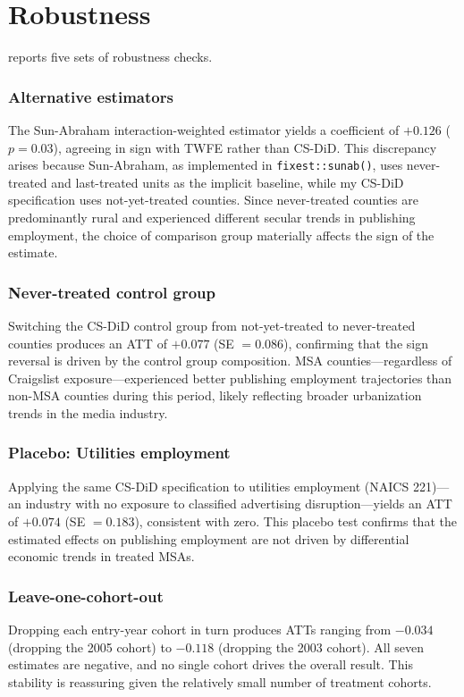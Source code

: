\documentclass[12pt]{article}
\begin{document}



\section{Robustness}

 reports five sets of robustness checks.

\subsubsection*{Alternative estimators} The Sun-Abraham interaction-weighted estimator \citep{sun_abraham_2021} yields a coefficient of $+0.126$ ($p = 0.03$), agreeing in sign with TWFE rather than CS-DiD. This discrepancy arises because Sun-Abraham, as implemented in \texttt{fixest::sunab()}, uses never-treated and last-treated units as the implicit baseline, while my CS-DiD specification uses not-yet-treated counties. Since never-treated counties are predominantly rural and experienced different secular trends in publishing employment, the choice of comparison group materially affects the sign of the estimate.

\subsubsection*{Never-treated control group} Switching the CS-DiD control group from not-yet-treated to never-treated counties produces an ATT of $+0.077$ (SE $= 0.086$), confirming that the sign reversal is driven by the control group composition. MSA counties---regardless of Craigslist exposure---experienced better publishing employment trajectories than non-MSA counties during this period, likely reflecting broader urbanization trends in the media industry.

\subsubsection*{Placebo: Utilities employment} Applying the same CS-DiD specification to utilities employment (NAICS 221)---an industry with no exposure to classified advertising disruption---yields an ATT of $+0.074$ (SE $= 0.183$), consistent with zero. This placebo test confirms that the estimated effects on publishing employment are not driven by differential economic trends in treated MSAs.

\subsubsection*{Leave-one-cohort-out} Dropping each entry-year cohort in turn produces ATTs ranging from $-0.034$ (dropping the 2005 cohort) to $-0.118$ (dropping the 2003 cohort). All seven estimates are negative, and no single cohort drives the overall result. This stability is reassuring given the relatively small number of treatment cohorts.
\end{document}
